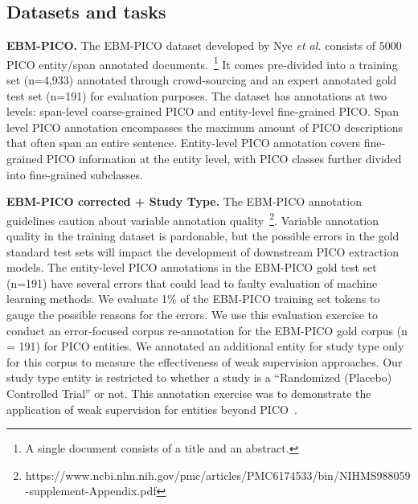 \documentclass[10.7pt,]{article}
\begin{document}
\subsection{Datasets and tasks}\label{data}
%
\textbf{EBM-PICO.}
The EBM-PICO dataset developed by Nye \textit{et al.} consists of 5000 PICO entity/span annotated documents.~\footnote{A single document consists of a title and an abstract.}
It comes pre-divided into a training set (n=4,933) annotated through crowd-sourcing and an expert annotated gold test set (n=191) for evaluation purposes.
The dataset has annotations at two levels: span-level coarse-grained PICO and entity-level fine-grained PICO.
Span level PICO annotation encompasses the maximum amount of PICO descriptions that often span an entire sentence.
Entity-level PICO annotation covers fine-grained PICO information at the entity level, with PICO classes further divided into fine-grained subclasses.



\textbf{EBM-PICO corrected + Study Type.}
The EBM-PICO annotation guidelines caution about variable annotation quality~\footnote{https://www.ncbi.nlm.nih.gov/pmc/articles/PMC6174533/bin/NIHMS988059-supplement-Appendix.pdf}.
Variable annotation quality in the training dataset is pardonable, but the possible errors in the gold standard test sets will impact the development of downstream PICO extraction models.
The entity-level PICO annotations in the EBM-PICO gold test set (n=191) have several errors that could lead to faulty evaluation of machine learning methods.
We evaluate 1\% of the EBM-PICO training set tokens to gauge the possible reasons for the errors.
We use this evaluation exercise to conduct an error-focused corpus re-annotation for the EBM-PICO gold corpus (n = 191) for PICO entities.
We annotated an additional entity for study type only for this corpus to measure the effectiveness of weak supervision approaches.
Our study type entity is restricted to whether a study is a ``Randomized (Placebo) Controlled Trial'' or not.
This annotation exercise was to demonstrate the application of weak supervision for entities beyond PICO~\cite{menard2019turning}.
\end{document}
